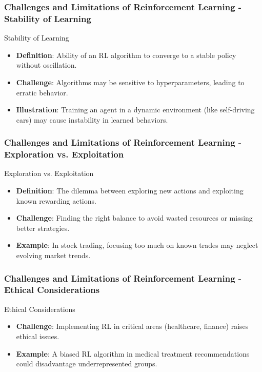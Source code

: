 \documentclass[aspectratio=169]{beamer}
\begin{document}
\begin{frame}[fragile]
    \frametitle{Challenges and Limitations of Reinforcement Learning - Stability of Learning}
    \begin{block}{Stability of Learning}
        \begin{itemize}
            \item \textbf{Definition}: Ability of an RL algorithm to converge to a stable policy without oscillation.
            \item \textbf{Challenge}: Algorithms may be sensitive to hyperparameters, leading to erratic behavior.
            \item \textbf{Illustration}: Training an agent in a dynamic environment (like self-driving cars) may cause instability in learned behaviors.
        \end{itemize}
    \end{block}
\end{frame}

\begin{frame}[fragile]
    \frametitle{Challenges and Limitations of Reinforcement Learning - Exploration vs. Exploitation}
    \begin{block}{Exploration vs. Exploitation}
        \begin{itemize}
            \item \textbf{Definition}: The dilemma between exploring new actions and exploiting known rewarding actions.
            \item \textbf{Challenge}: Finding the right balance to avoid wasted resources or missing better strategies.
            \item \textbf{Example}: In stock trading, focusing too much on known trades may neglect evolving market trends.
        \end{itemize}
    \end{block}
\end{frame}

\begin{frame}[fragile]
    \frametitle{Challenges and Limitations of Reinforcement Learning - Ethical Considerations}
    \begin{block}{Ethical Considerations}
        \begin{itemize}
            \item \textbf{Challenge}: Implementing RL in critical areas (healthcare, finance) raises ethical issues.
            \item \textbf{Example}: A biased RL algorithm in medical treatment recommendations could disadvantage underrepresented groups.
        \end{itemize}
    \end{block}
\end{frame}
\end{document}
